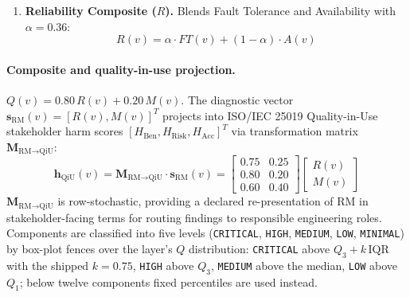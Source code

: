 \begin{enumerate}
\begin{equation}
    \begin{aligned}
    \mathrm{CouplingRisk\_enh}(v) &= \min\!\big(1,\; \big[1 - |2\iota(v) - 1|\big]\,(1 + 0.10\,\mathrm{PC}(v))\big) \\
    M(v) = & \; 0.35\,\mathrm{BT}(v) + 0.30\,w_{\text{out}}(v) + 0.15\,\mathrm{CQP}(v) \\
           & + 0.12\,\mathrm{CouplingRisk\_enh}(v) + 0.08\,(1-\mathrm{CC}(v))
    \end{aligned}
    \end{equation}
    \item \textbf{Reliability Composite ($R$).} Blends Fault Tolerance and Availability with $\alpha = 0.36$:
    \begin{equation}
    R(v) = \alpha \cdot FT(v) + (1-\alpha) \cdot A(v)
    \end{equation}
\end{enumerate}

\paragraph{Composite and quality-in-use projection.}
$Q(v) = 0.80\,R(v) + 0.20\,M(v)$. The diagnostic vector $\mathbf{s}_{\text{RM}}(v) = [R(v), M(v)]^T$ projects into ISO/IEC 25019 Quality-in-Use stakeholder harm scores $[H_{\text{Ben}}, H_{\text{Risk}}, H_{\text{Acc}}]^T$ via transformation matrix $\mathbf{M}_{\text{RM} \to \text{QiU}}$:
\begin{equation}
\mathbf{h}_{\text{QiU}}(v) = \mathbf{M}_{\text{RM} \to \text{QiU}} \cdot \mathbf{s}_{\text{RM}}(v) = \begin{bmatrix} 0.75 & 0.25 \\ 0.80 & 0.20 \\ 0.60 & 0.40 \end{bmatrix} \begin{bmatrix} R(v) \\ M(v) \end{bmatrix}
\end{equation}
$\mathbf{M}_{\text{RM} \to \text{QiU}}$ is row-stochastic, providing a declared re-presentation of RM in stakeholder-facing terms for routing findings to responsible engineering roles. Components are classified into five levels (\texttt{CRITICAL}, \texttt{HIGH}, \texttt{MEDIUM}, \texttt{LOW}, \texttt{MINIMAL}) by box-plot fences over the layer's $Q$ distribution: \texttt{CRITICAL} above $Q_3 + k\,\mathrm{IQR}$ with the shipped $k = 0.75$, \texttt{HIGH} above $Q_3$, \texttt{MEDIUM} above the median, \texttt{LOW} above $Q_1$; below twelve components fixed percentiles are used instead.

